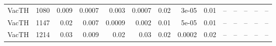 \begin{table}
\begin{tabular}{lrrrrrrrrrrrrr}
  VacTH & 1080 &           0.009 &           0.0007 &        0.003 &       0.0007 &                   0.02 &       3e-05 &        0.01 &           -- &            -- &               -- &            -- &             -- \\
  VacTH & 1147 &            0.02 &            0.007 &       0.0009 &        0.002 &                   0.01 &       5e-05 &        0.01 &           -- &            -- &               -- &            -- &             -- \\
  VacTH & 1214 &            0.03 &            0.009 &         0.02 &         0.03 &                   0.02 &      0.0002 &        0.02 &           -- &            -- &               -- &            -- &             -- \\


\end{tabular}
\end{table}
